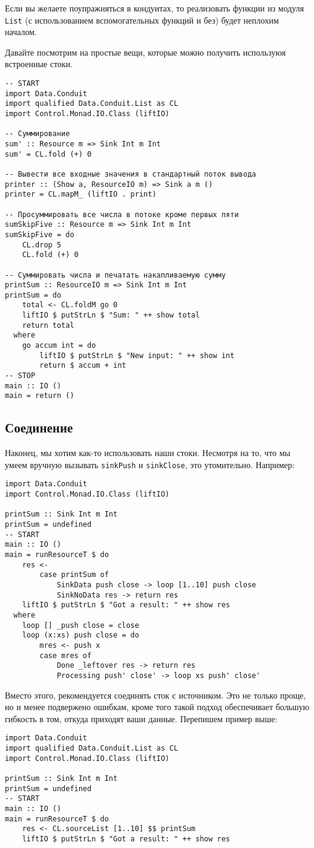 Если вы желаете поупражняться в кондуитах, то реализовать функции из модуля 
\lstinline'List' (с использованием вспомогательных функций и без) будет неплохим началом.

Давайте посмотрим на простые вещи, которые можно получить используюя встроенные стоки.
\begin{lstlisting}
-- START
import Data.Conduit
import qualified Data.Conduit.List as CL
import Control.Monad.IO.Class (liftIO)

-- Суммирование
sum' :: Resource m => Sink Int m Int
sum' = CL.fold (+) 0

-- Вывести все входные значения в стандартный поток вывода
printer :: (Show a, ResourceIO m) => Sink a m ()
printer = CL.mapM_ (liftIO . print)

-- Просуммировать все числа в потоке кроме первых пяти
sumSkipFive :: Resource m => Sink Int m Int
sumSkipFive = do
    CL.drop 5
    CL.fold (+) 0

-- Суммировать числа и печатать накапливаемую сумму
printSum :: ResourceIO m => Sink Int m Int
printSum = do
    total <- CL.foldM go 0
    liftIO $ putStrLn $ "Sum: " ++ show total
    return total
  where
    go accum int = do
        liftIO $ putStrLn $ "New input: " ++ show int
        return $ accum + int
-- STOP
main :: IO ()
main = return ()
\end{lstlisting}

\subsection{Соединение}
Наконец, мы хотим как-то использовать наши стоки. Несмотря на то, что мы умеем вручную вызывать
\verb*|sinkPush| и \verb*|sinkClose|, это утомительно. Например:
\begin{lstlisting}
import Data.Conduit
import Control.Monad.IO.Class (liftIO)

printSum :: Sink Int m Int
printSum = undefined
-- START
main :: IO ()
main = runResourceT $ do
    res <-
        case printSum of
            SinkData push close -> loop [1..10] push close
            SinkNoData res -> return res
    liftIO $ putStrLn $ "Got a result: " ++ show res
  where
    loop [] _push close = close
    loop (x:xs) push close = do
        mres <- push x
        case mres of
            Done _leftover res -> return res
            Processing push' close' -> loop xs push' close'
\end{lstlisting}
Вместо этого, рекомендуется соединять сток с источником. Это не только проще, 
но и менее подвержено ошибкам, кроме того такой подход обеспечивает большую гибкость в том, откуда приходят ваши данные.
Перепишем пример выше:
\begin{lstlisting}
import Data.Conduit
import qualified Data.Conduit.List as CL
import Control.Monad.IO.Class (liftIO)

printSum :: Sink Int m Int
printSum = undefined
-- START
main :: IO ()
main = runResourceT $ do
    res <- CL.sourceList [1..10] $$ printSum
    liftIO $ putStrLn $ "Got a result: " ++ show res
\end{lstlisting}

